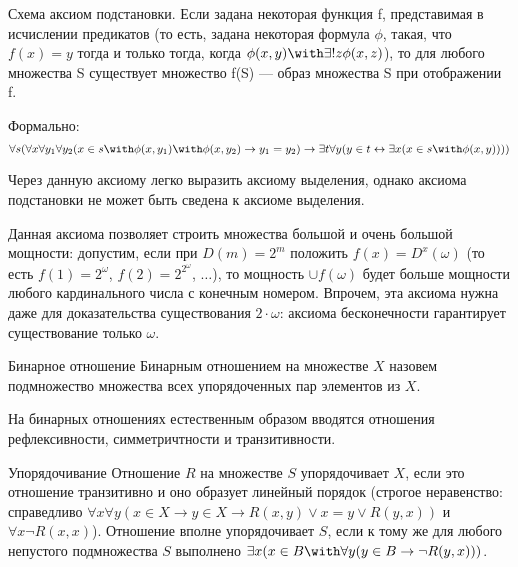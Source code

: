 \begin{axiom}{Схема аксиом подстановки.}
Если задана некоторая функция f, представимая в исчислении предикатов
(то есть, задана некоторая формула $\phi$, такая, что $f(x) = y$
тогда и только тогда, когда $\phi(x,y) \with \exists ! z \phi(x,z)$),
то для любого множества S существует множество f(S) --- образ
множества S при отображении f.

Формально: 
$$\forall s (\forall x \forall y_1 \forall y_2 (x \in s \with \phi (x,y_1) \with \phi
(x,y_2) \rightarrow y_1=y_2) \rightarrow 
\exists t \forall y (y \in t 
\leftrightarrow \exists x (x \in s \with \phi (x,y)))) $$
\end{axiom}

Через данную аксиому легко выразить аксиому выделения,
%
однако аксиома подстановки не может быть сведена к аксиоме выделения.

Данная аксиома позволяет строить множества большой и очень большой мощности:
допустим, если при $D(m)=2^m$ положить $f(x) = D^x(\omega)$ 
(то есть $f(1) = 2^\omega$, $f(2) = 2^{2^\omega}$, $\dots$), 
то мощность $\cup f(\omega)$ будет больше мощности
любого кардинального числа с конечным номером.
Впрочем, эта аксиома нужна даже для доказательства
существования $2 \cdot \omega$: аксиома бесконечности гарантирует
существование только $\omega$.

\begin{definition}{Бинарное отношение}
Бинарным отношением на множестве $X$ назовем подмножество множества
всех упорядоченных пар элементов из $X$.
\end{definition}

На бинарных отношениях естественным образом вводятся отношения 
рефлексивности, симметричтности и транзитивности.

\begin{definition}{Упорядочивание}
Отношение $R$ на множестве $S$ упорядочивает $X$, если это отношение
транзитивно и оно образует линейный порядок 
(строгое неравенство: справедливо
$\forall x \forall y (x \in X \rightarrow y \in X \rightarrow R(x,y) \vee x =
y \vee R(y,x))$ и
$\forall x \neg R(x,x)$).
Отношение вполне упорядочивает $S$, если к тому же для любого 
непустого подмножества $S$ выполнено 
$\exists x (x \in B \with \forall y (y \in B \rightarrow \neg R(y,x)))$.
\end{definition}

